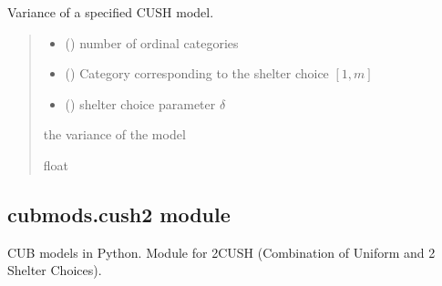 \documentclass[letterpaper,10pt,english]{sphinxmanual}
\begin{document}
\begin{fulllineitems}
\label{\detokenize{cubmods:cubmods.cush.var}}
\pysigstartsignatures
{}
\pysigstopsignatures
\sphinxAtStartPar
Variance of a specified CUSH model.
\begin{quote}\begin{description}
\begin{itemize}
\item {} 
\sphinxAtStartPar
{} () \textendash{} number of ordinal categories

\item {} 
\sphinxAtStartPar
{} () \textendash{} Category corresponding to the shelter choice \([1,m]\)

\item {} 
\sphinxAtStartPar
{} () \textendash{} shelter choice parameter \(\delta\)

\end{itemize}

\sphinxAtStartPar
the variance of the model

\sphinxAtStartPar
float

\end{description}\end{quote}

\end{fulllineitems}



\subsection{cubmods.cush2 module}
\label{\detokenize{cubmods:module-cubmods.cush2}}\label{\detokenize{cubmods:cubmods-cush2-module}}
\sphinxAtStartPar
CUB models in Python.
Module for 2\sphinxhyphen{}CUSH (Combination of Uniform
and 2 Shelter Choices).
\end{document}
